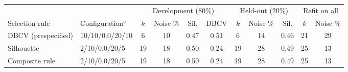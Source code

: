 \begin{tabular}{llccccccccc}\toprule
 & & \multicolumn{4}{c}{Development (80\%)} & \multicolumn{3}{c}{Held-out (20\%)} & \multicolumn{2}{c}{Refit on all} \\ \cmidrule(lr){3-6}\cmidrule(lr){7-9}\cmidrule(lr){10-11}
Selection rule & Configuration$^a$ & $k$ & Noise \% & Sil. & DBCV & $k$ & Noise \% & Sil. & $k$ & Noise \% \\ \midrule
DBCV (prespecified) & 10/10/0.0/20/10 & 6 & 10 & 0.47 & 0.51 & 6 & 14 & 0.46 & 21 & 29 \\
Silhouette & 2/10/0.0/20/5 & 19 & 18 & 0.50 & 0.24 & 19 & 28 & 0.49 & 25 & 13 \\
Composite rule & 2/10/0.0/20/5 & 19 & 18 & 0.50 & 0.24 & 19 & 28 & 0.49 & 25 & 13 \\
\bottomrule\end{tabular}